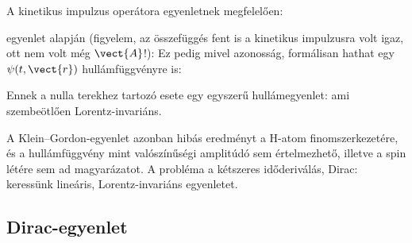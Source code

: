    A kinetikus impulzus operátora  egyenletnek megfelelően: 
   
    egyenlet alapján (figyelem, az összefüggés fent is a kinetikus impulzusra volt igaz, ott nem volt még $\vect{A}$!):
   Ez pedig mivel azonosság, formálisan hathat egy $\psi(t,\vect{r})$ hullámfüggvényre is:
   
   Ennek a nulla terekhez tartozó esete egy egyszerű hullámegyenlet: 
   ami szembeötlően Lorentz-invariáns. 
   
   A Klein--Gordon-egyenlet azonban hibás eredményt a H-atom finomszerkezetére, és a hullámfüggvény mint valószínűségi amplitúdó sem értelmezhető, illetve a spin létére sem ad magyarázatot.
   A probléma a kétszeres időderiválás, Dirac: keressünk lineáris, Lorentz-invariáns egyenletet.
   
  \subsection{Dirac-egyenlet}
   
